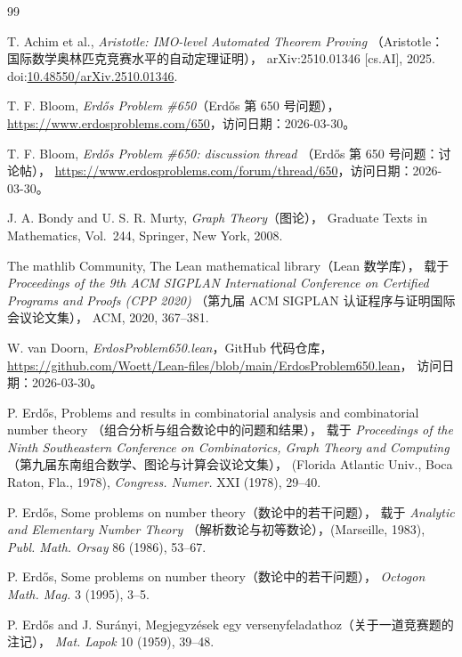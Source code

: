 \documentclass[UTF8,a4paper,oneside,openany,fontset=fandol,zihao=-4]{ctexbook}
\theoremstyle{chinesestyle}
\begin{document}
\begin{thebibliography}{99}

T. Achim et al.,
\emph{Aristotle: IMO-level Automated Theorem Proving}
（Aristotle：国际数学奥林匹克竞赛水平的自动定理证明），
arXiv:2510.01346 [cs.AI], 2025.
doi:\href{https://doi.org/10.48550/arXiv.2510.01346}{10.48550/arXiv.2510.01346}.

T. F. Bloom,
\emph{Erdős Problem \#650}（Erdős 第 650 号问题），
\url{https://www.erdosproblems.com/650}，访问日期：2026-03-30。

T. F. Bloom,
\emph{Erdős Problem \#650: discussion thread}
（Erdős 第 650 号问题：讨论帖），
\url{https://www.erdosproblems.com/forum/thread/650}，访问日期：2026-03-30。

J. A. Bondy and U. S. R. Murty,
\emph{Graph Theory}（图论），
Graduate Texts in Mathematics, Vol.~244, Springer, New York, 2008.

The mathlib Community,
The Lean mathematical library（Lean 数学库），
载于 \emph{Proceedings of the 9th ACM SIGPLAN International Conference on Certified Programs and Proofs (CPP 2020)}
（第九届 ACM SIGPLAN 认证程序与证明国际会议论文集），
ACM, 2020, 367--381.

W. van Doorn,
\emph{ErdosProblem650.lean}，GitHub 代码仓库，
\url{https://github.com/Woett/Lean-files/blob/main/ErdosProblem650.lean}，
访问日期：2026-03-30。

P. Erdős,
Problems and results in combinatorial analysis and combinatorial number theory
（组合分析与组合数论中的问题和结果），
载于 \emph{Proceedings of the Ninth Southeastern Conference on Combinatorics, Graph Theory and Computing}
（第九届东南组合数学、图论与计算会议论文集），
(Florida Atlantic Univ., Boca Raton, Fla., 1978),
\emph{Congress. Numer.} XXI (1978), 29--40.

P. Erdős,
Some problems on number theory（数论中的若干问题），
载于 \emph{Analytic and Elementary Number Theory}
（解析数论与初等数论），(Marseille, 1983),
\emph{Publ. Math. Orsay} 86 (1986), 53--67.

P. Erdős,
Some problems on number theory（数论中的若干问题），
\emph{Octogon Math. Mag.} 3 (1995), 3--5.

P. Erdős and J. Surányi,
Megjegyzések egy versenyfeladathoz（关于一道竞赛题的注记），
\emph{Mat. Lapok} 10 (1959), 39--48.


\end{thebibliography}
\end{document}
